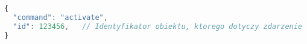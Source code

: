 \begin{lstlisting}[language=JavaScript,numbers=none]
{
  "command": "activate",
  "id": 123456,   // Identyfikator obiektu, ktorego dotyczy zdarzenie
}
\end{lstlisting} 